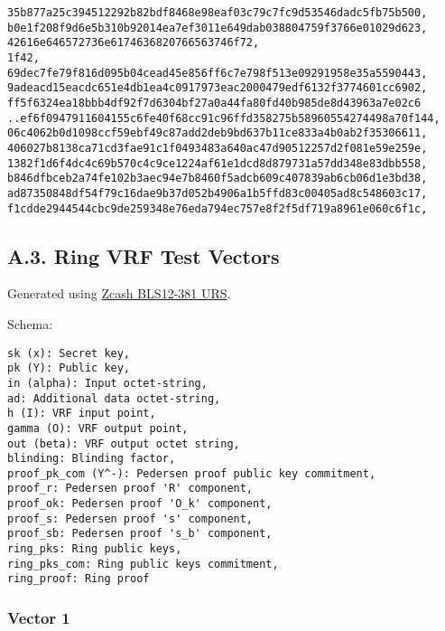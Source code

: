 \documentclass[
]{article}
\begin{document}
\begin{verbatim}
35b877a25c394512292b82bdf8468e98eaf03c79c7fc9d53546dadc5fb75b500,
b0e1f208f9d6e5b310b92014ea7ef3011e649dab038804759f3766e01029d623,
42616e646572736e6174636820766563746f72,
1f42,
69dec7fe79f816d095b04cead45e856ff6c7e798f513e09291958e35a5590443,
9adeacd15eacdc651e4db1ea4c0917973eac2000479edf6132f3774601cc6902,
ff5f6324ea18bbb4df92f7d6304bf27a0a44fa80fd40b985de8d43963a7e02c6
..ef6f0947911604155c6fe40f68cc91c96ffd358275b58960554274498a70f144,
06c4062b0d1098ccf59ebf49c87add2deb9bd637b11ce833a4b0ab2f35306611,
406027b8138ca71cd3fae91c1f0493483a640ac47d90512257d2f081e59e259e,
1382f1d6f4dc4c69b570c4c9ce1224af61e1dcd8d879731a57dd348e83dbb558,
b846dfbceb2a74fe102b3aec94e7b8460f5adcb609c407839ab6cb06d1e3bd38,
ad87350848df54f79c16dae9b37d052b4906a1b5ffd83c00405ad8c548603c17,
f1cdde2944544cbc9de259348e76eda794ec757e8f2f5df719a8961e060c6f1c,
\end{verbatim}

\hypertarget{a.3.-ring-vrf-test-vectors}{%
\subsection{A.3. Ring VRF Test
Vectors}\label{a.3.-ring-vrf-test-vectors}}

Generated using
\href{https://zfnd.org/conclusion-of-the-powers-of-tau-ceremony}{Zcash
BLS12-381 URS}.

Schema:

\begin{verbatim}
sk (x): Secret key,
pk (Y): Public key,
in (alpha): Input octet-string,
ad: Additional data octet-string,
h (I): VRF input point,
gamma (O): VRF output point,
out (beta): VRF output octet string,
blinding: Blinding factor,
proof_pk_com (Y^-): Pedersen proof public key commitment,
proof_r: Pedersen proof 'R' component,
proof_ok: Pedersen proof 'O_k' component,
proof_s: Pedersen proof 's' component,
proof_sb: Pedersen proof 's_b' component,
ring_pks: Ring public keys,
ring_pks_com: Ring public keys commitment,
ring_proof: Ring proof
\end{verbatim}

\hypertarget{vector-1-2}{%
\subsubsection{Vector 1}\label{vector-1-2}}
\end{document}
